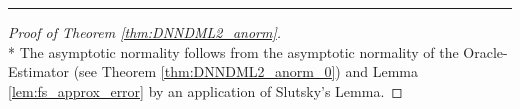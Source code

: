 \hrule

\begin{proof}[Proof of Theorem \ref{thm:DNNDML2_anorm}]\mbox{}\\*
    The asymptotic normality follows from the asymptotic normality of the Oracle-Estimator (see Theorem \ref{thm:DNNDML2_anorm_0}) and Lemma \ref{lem:fs_approx_error} by an application of Slutsky's Lemma.
\end{proof}
